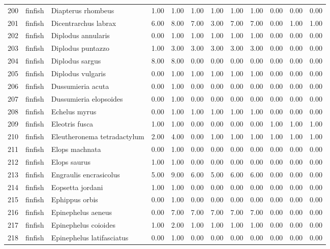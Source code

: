 \begin{table}[ht]
\begin{tabular}{rllrrrrrrrrr}
  200 & finfish & Diapterus rhombeus & 1.00 & 1.00 & 1.00 & 1.00 & 1.00 & 1.00 & 0.00 & 0.00 & 0.00 \\ 
  201 & finfish & Dicentrarchus labrax & 6.00 & 8.00 & 7.00 & 3.00 & 7.00 & 7.00 & 0.00 & 1.00 & 1.00 \\ 
  202 & finfish & Diplodus annularis & 0.00 & 1.00 & 1.00 & 1.00 & 1.00 & 1.00 & 0.00 & 0.00 & 0.00 \\ 
  203 & finfish & Diplodus puntazzo & 1.00 & 3.00 & 3.00 & 3.00 & 3.00 & 3.00 & 0.00 & 0.00 & 0.00 \\ 
  204 & finfish & Diplodus sargus & 8.00 & 8.00 & 0.00 & 0.00 & 0.00 & 0.00 & 0.00 & 0.00 & 0.00 \\ 
  205 & finfish & Diplodus vulgaris & 0.00 & 1.00 & 1.00 & 1.00 & 1.00 & 1.00 & 0.00 & 0.00 & 0.00 \\ 
  206 & finfish & Dussumieria acuta & 0.00 & 1.00 & 0.00 & 0.00 & 0.00 & 0.00 & 0.00 & 0.00 & 0.00 \\ 
  207 & finfish & Dussumieria elopsoides & 0.00 & 1.00 & 0.00 & 0.00 & 0.00 & 0.00 & 0.00 & 0.00 & 0.00 \\ 
  208 & finfish & Echelus myrus & 0.00 & 1.00 & 1.00 & 1.00 & 1.00 & 1.00 & 0.00 & 0.00 & 0.00 \\ 
  209 & finfish & Eleotris fusca & 1.00 & 1.00 & 0.00 & 0.00 & 0.00 & 0.00 & 1.00 & 1.00 & 1.00 \\ 
  210 & finfish & Eleutheronema tetradactylum & 2.00 & 4.00 & 0.00 & 1.00 & 1.00 & 1.00 & 1.00 & 1.00 & 1.00 \\ 
  211 & finfish & Elops machnata & 0.00 & 1.00 & 0.00 & 0.00 & 0.00 & 0.00 & 0.00 & 0.00 & 0.00 \\ 
  212 & finfish & Elops saurus & 1.00 & 1.00 & 0.00 & 0.00 & 0.00 & 0.00 & 0.00 & 0.00 & 0.00 \\ 
  213 & finfish & Engraulis encrasicolus & 5.00 & 9.00 & 6.00 & 5.00 & 6.00 & 6.00 & 0.00 & 0.00 & 0.00 \\ 
  214 & finfish & Eopsetta jordani & 1.00 & 1.00 & 0.00 & 0.00 & 0.00 & 0.00 & 0.00 & 0.00 & 0.00 \\ 
  215 & finfish & Ephippus orbis & 0.00 & 1.00 & 0.00 & 0.00 & 0.00 & 0.00 & 0.00 & 0.00 & 0.00 \\ 
  216 & finfish & Epinephelus aeneus & 0.00 & 7.00 & 7.00 & 7.00 & 7.00 & 7.00 & 0.00 & 0.00 & 0.00 \\ 
  217 & finfish & Epinephelus coioides & 1.00 & 2.00 & 1.00 & 1.00 & 1.00 & 1.00 & 0.00 & 0.00 & 0.00 \\ 
  218 & finfish & Epinephelus latifasciatus & 0.00 & 1.00 & 0.00 & 0.00 & 0.00 & 0.00 & 0.00 & 0.00 & 0.00 \\ 

\end{tabular}
\end{table}
